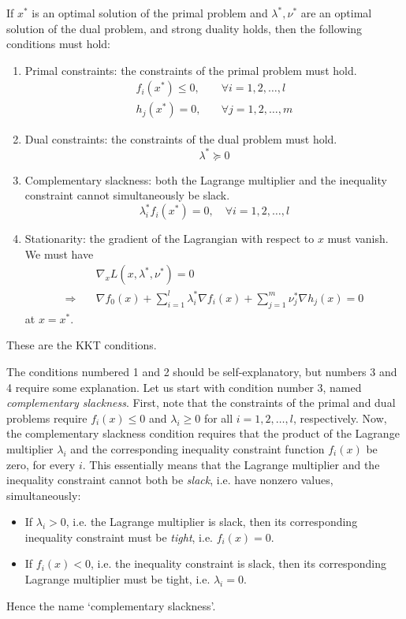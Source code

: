 \documentclass[a4paper]{article}
\theoremstyle{definition}
\begin{document}
If $x^*$ is an optimal solution of the primal problem and $\lambda^*, \nu^*$ are an optimal solution of the dual problem, and strong duality holds, then the following conditions must hold:
\begin{enumerate}
	\item Primal constraints: the constraints of the primal problem must hold.
		\begin{align*}
			f_i(x^*) \leq 0, & \quad \forall i = 1, 2, \dots, l \\
			h_j(x^*) = 0, & \quad \forall j = 1, 2, \dots, m
		\end{align*}
	\item Dual constraints: the constraints of the dual problem must hold.
		\begin{equation*}
			\lambda^* \succeq 0
		\end{equation*}
	\item Complementary slackness: both the Lagrange multiplier and the inequality constraint cannot simultaneously be slack.
		\begin{equation*}
			\lambda_i^* f_i(x^*) = 0, \quad \forall i = 1, 2, \dots, l
		\end{equation*}
	\item Stationarity: the gradient of the Lagrangian with respect to $x$ must vanish. We must have
		\begin{align*}
			& \nabla_x L(x, \lambda^*, \nu^*) = 0 \\
			\Rightarrow \quad & \nabla f_0(x) + \sum_{i=1}^l \lambda_i^* \nabla f_i(x) + \sum_{j=1}^m \nu_j^* \nabla h_j(x) = 0
		\end{align*}
		at $x = x^*$.
\end{enumerate}
These are the KKT conditions.

The conditions numbered 1 and 2 should be self-explanatory, but numbers 3 and 4 require some explanation.
Let us start with condition number 3, named \textit{complementary slackness}.
First, note that the constraints of the primal and dual problems require $f_i(x) \leq 0$ and $\lambda_i \geq 0$ for all $i = 1, 2, \dots, l$, respectively.
Now, the complementary slackness condition requires that the product of the Lagrange multiplier $\lambda_i$ and the corresponding inequality constraint function $f_i(x)$ be zero, for every $i$.
This essentially means that the Lagrange multiplier and the inequality constraint cannot both be \textit{slack}, i.e. have nonzero values, simultaneously:
\begin{itemize}
	\item If $\lambda_i > 0$, i.e. the Lagrange multiplier is slack, then its corresponding inequality constraint must be \textit{tight}, i.e. $f_i(x) = 0$.
	\item If $f_i(x) < 0$, i.e. the inequality constraint is slack, then its corresponding Lagrange multiplier must be tight, i.e. $\lambda_i = 0$.
\end{itemize}
Hence the name `complementary slackness'.
\end{document}
